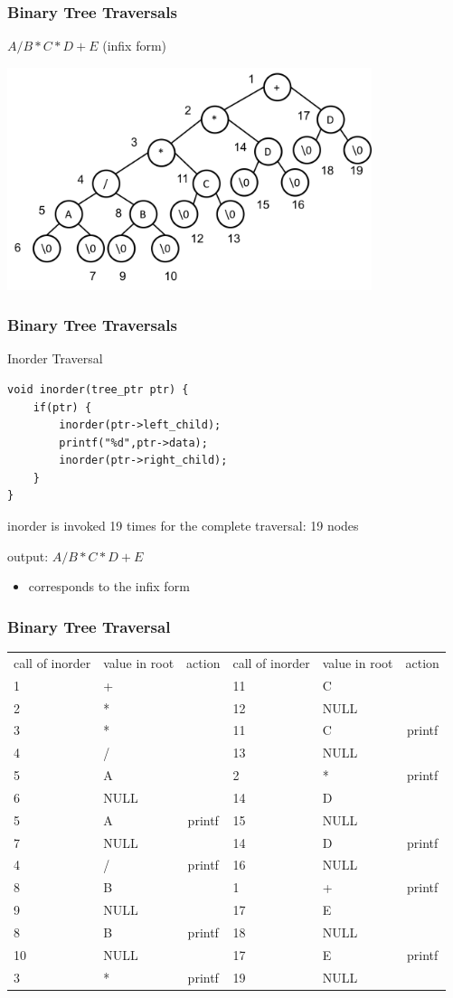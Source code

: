 \documentclass[newPxFont,sthlmFooter,nooffset]{beamer}
\begin{document}
\begin{frame}[t]
  \frametitle{Binary Tree Traversals}
$A/B*C*D+E$ (infix form)
  \begin{center}
    \includegraphics[width=0.8\textwidth]{figures/fig10_infix.png}
  \end{center}

\end{frame}


\begin{frame}[t, fragile]
  \frametitle{Binary Tree Traversals}
Inorder Traversal

\begin{lstlisting}
void inorder(tree_ptr ptr) { 
    if(ptr) {
        inorder(ptr->left_child); 
        printf("%d",ptr->data); 
        inorder(ptr->right_child);
    } 
}  
\end{lstlisting}
inorder is invoked 19 times for the complete traversal: 19 nodes

output: $A/B*C*D+E$
\begin{itemize}
\item  corresponds to the infix form
\end{itemize}

\end{frame}

\begin{frame}[t]
  \frametitle{Binary Tree Traversal}
  \begin{tabular}{p{4em} p{4em} c || p{4em} p{4em} c}
call of inorder & value in root & action & call of inorder & value in root & action \\
1	&	+	&		&	11	&	C	&		\\
2	&	*	&		&	12	&	NULL	&		\\
3	&	*	&		&	11	&	C	&	printf	\\
4	&	/	&		&	13	&	NULL	&		\\
5	&	A	&		&	2	&	*	&	printf	\\
6	&	NULL	&		&	14	&	D	&		\\
5	&	A	&	printf	&	15	&	NULL	&		\\
7	&	NULL	&		&	14	&	D	&	printf	\\
4	&	/	&	printf	&	16	&	NULL	&		\\
8	&	B	&		&	1	&	+	&	printf	\\
9	&	NULL	&		&	17	&	E	&		\\
8	&	B	&	printf	&	18	&	NULL	&		\\
10	&	NULL	&		&	17	&	E	&	printf	\\
3	&	*	&	printf	&	19	&	NULL	&		\\    
  \end{tabular}
\end{frame}
\end{document}
